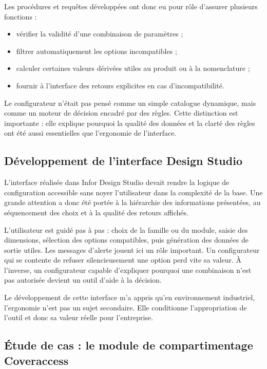 Les procédures et requêtes développées ont donc eu pour rôle d'assurer plusieurs fonctions :

\begin{itemize}[leftmargin=1.4cm]
\item vérifier la validité d'une combinaison de paramètres ;
\item filtrer automatiquement les options incompatibles ;
\item calculer certaines valeurs dérivées utiles au produit ou à la nomenclature ;
\item fournir à l'interface des retours explicites en cas d'incompatibilité.
\end{itemize}

Le configurateur n'était pas pensé comme un simple catalogue dynamique, mais comme un moteur de décision encadré par des règles. Cette distinction est importante : elle explique pourquoi la qualité des données et la clarté des règles ont été aussi essentielles que l'ergonomie de l'interface.

\subsection{Développement de l'interface Design Studio}

L'interface réalisée dans Infor Design Studio devait rendre la logique de configuration accessible sans noyer l'utilisateur dans la complexité de la base. Une grande attention a donc été portée à la hiérarchie des informations présentées, au séquencement des choix et à la qualité des retours affichés.

L'utilisateur est guidé pas à pas : choix de la famille ou du module, saisie des dimensions, sélection des options compatibles, puis génération des données de sortie utiles. Les messages d'alerte jouent ici un rôle important. Un configurateur qui se contente de refuser silencieusement une option perd vite sa valeur. À l'inverse, un configurateur capable d'expliquer pourquoi une combinaison n'est pas autorisée devient un outil d'aide à la décision.

Le développement de cette interface m'a appris qu'en environnement industriel, l'ergonomie n'est pas un sujet secondaire. Elle conditionne l'appropriation de l'outil et donc sa valeur réelle pour l'entreprise.

\subsection{Étude de cas : le module de compartimentage Coveraccess}

